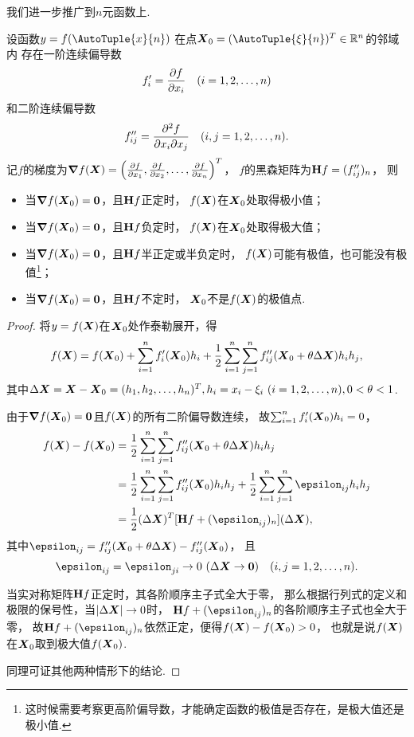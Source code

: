 我们进一步推广到\(n\)元函数上.
\begingroup
\def\x{\vb{X}}
\def\X#1{\x_{#1}}
\def\z{\vb{0}}

\begin{theorem}\label{theorem:多元函数微分法.n元函数极值存在的条件}
设函数\(y = f(\AutoTuple{x}{n})\)
在点\(\X0=(\AutoTuple{\xi}{n})^T\in\mathbb{R}^n\)的邻域内
存在一阶连续偏导数\[
	f'_i = \pdv{f}{x_i}
	\quad(i=1,2,\dotsc,n)
\]
和二阶连续偏导数\[
	f''_{ij} = \pdv[2]{f}{x_i}{x_j}
	\quad(i,j=1,2,\dotsc,n).
\]
记\(f\)的梯度为\(\grad f(\x)
= \left(\pdv{f}{x_1},\pdv{f}{x_2},\dotsc,\pdv{f}{x_n}\right)^T\)，
\(f\)的黑森矩阵为\(\boldsymbol{\operatorname{H}} f = (f''_{ij})_n\)，
则\begin{itemize}
	\item 当\(\grad f(\X0) = \z\)，且\(\boldsymbol{\operatorname{H}} f\)正定时，
	\(f(\x)\)在\(\X0\)处取得极小值；
	\item 当\(\grad f(\X0) = \z\)，且\(\boldsymbol{\operatorname{H}} f\)负定时，
	\(f(\x)\)在\(\X0\)处取得极大值；
	\item 当\(\grad f(\X0) = \z\)，且\(\boldsymbol{\operatorname{H}} f\)半正定或半负定时，
	\(f(\x)\)可能有极值，也可能没有极值\footnote{%
	这时候需要考察更高阶偏导数，才能确定函数的极值是否存在，是极大值还是极小值.}；
	\item 当\(\grad f(\X0) = \z\)，且\(\boldsymbol{\operatorname{H}} f\)不定时，
	\(\X0\)不是\(f(\x)\)的极值点.
\end{itemize}
\begin{proof}
将\(y = f(\x)\)在\(\X0\)处作泰勒展开，得\[
	f(\x) = f(\X0)
	+ \sum_{i=1}^n f'_i(\X0) h_i
	+ \frac{1}{2} \sum_{i=1}^n \sum_{j=1}^n
		f''_{ij}(\X0+\theta\increment\x) h_i h_j,
\]
其中\(\increment\x=\x-\X0=(h_1,h_2,\dotsc,h_n)^T,
h_i = x_i - \xi_i\ (i=1,2,\dotsc,n),
0<\theta<1\).

由于\(\grad f(\X0) = \z\)且\(f(\x)\)的所有二阶偏导数连续，
故\(\sum_{i=1}^n f'_i(\X0) h_i = 0\)，
\begin{align*}
	f(\x) - f(\X0)
	&= \frac{1}{2} \sum_{i=1}^n \sum_{j=1}^n
		f''_{ij}(\X0+\theta\increment\x) h_i h_j \\
	&= \frac{1}{2} \sum_{i=1}^n \sum_{j=1}^n
		f''_{ij}(\X0) h_i h_j
		+ \frac{1}{2} \sum_{i=1}^n \sum_{j=1}^n
		\epsilon_{ij} h_i h_j \\
	&= \frac{1}{2} (\increment\x)^T [\hessian f + (\epsilon_{ij})_n] (\increment\x),
\end{align*}
其中\(\epsilon_{ij} = f''_{ij}(\X0+\theta\increment\x) - f''_{ij}(\X0)\)，
且\[
	\epsilon_{ij} = \epsilon_{ji}\to0\ (\increment\x\to\z)
	\quad(i,j=1,2,\dotsc,n).
\]

当实对称矩阵\(\boldsymbol{\operatorname{H}} f\)正定时，其各阶顺序主子式全大于零，
那么根据行列式的定义和极限的保号性，当\(\abs{\increment\x}\to0\)时，
\(\hessian f + (\epsilon_{ij})_n\)的各阶顺序主子式也全大于零，
故\(\hessian f + (\epsilon_{ij})_n\)依然正定，便得\(f(\x) - f(\X0) > 0\)，
也就是说\(f(\x)\)在\(\X0\)取到极大值\(f(\X0)\).

同理可证其他两种情形下的结论.
\end{proof}
\end{theorem}


